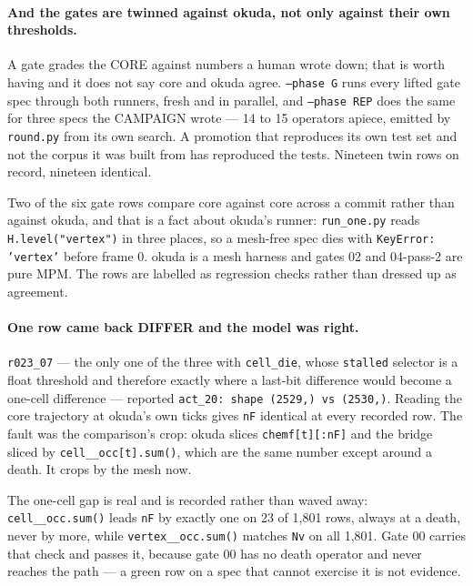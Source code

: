 \documentclass[11pt,a4paper]{article}
\newcommand{\code}[1]{\texttt{\small #1}}
\begin{document}
\paragraph{And the gates are twinned against okuda, not only against their own thresholds.}
A gate grades the CORE against numbers a human wrote down; that is worth having and it does not say
core and okuda agree. \code{--phase G} runs every lifted gate spec through both runners, fresh and in
parallel, and \code{--phase REP} does the same for three specs the CAMPAIGN wrote --- 14 to 15
operators apiece, emitted by \code{round.py} from its own search. A promotion that reproduces its own
test set and not the corpus it was built from has reproduced the tests. Nineteen twin rows on record,
nineteen identical.

Two of the six gate rows compare core against core across a commit rather than against okuda, and
that is a fact about okuda's runner: \code{run\_one.py} reads \code{H.level("vertex")} in three
places, so a mesh-free spec dies with \code{KeyError: 'vertex'} before frame 0. okuda is a mesh
harness and gates 02 and 04-pass-2 are pure MPM. The rows are labelled as regression checks rather
than dressed up as agreement.

\paragraph{One row came back DIFFER and the model was right.} \code{r023\_07} --- the only one of the
three with \code{cell\_die}, whose \code{stalled} selector is a float threshold and therefore exactly
where a last-bit difference would become a one-cell difference --- reported
\code{act\_20: shape (2529,) vs (2530,)}. Reading the core trajectory at okuda's own ticks gives
\code{nF} identical at every recorded row. The fault was the comparison's crop: okuda slices
\code{chemf[t][:nF]} and the bridge sliced by \code{cell\_\_occ[t].sum()}, which are the same number
except around a death. It crops by the mesh now.

The one-cell gap is real and is recorded rather than waved away: \code{cell\_\_occ.sum()} leads
\code{nF} by exactly one on 23 of 1{,}801 rows, always at a death, never by more, while
\code{vertex\_\_occ.sum()} matches \code{Nv} on all 1{,}801. Gate 00 carries that check and passes
it, because gate 00 has no death operator and never reaches the path --- a green row on a spec that
cannot exercise it is not evidence.
\end{document}
